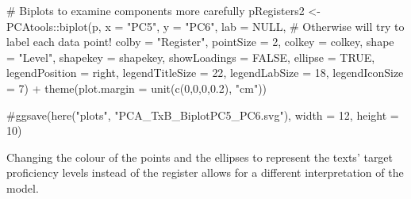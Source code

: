 \documentclass[
  letterpaper,
  DIV=11,
  numbers=noendperiod]{scrreprt}
\newenvironment{Shaded}{\begin{snugshade}}{\end{snugshade}}
\newcommand{\AttributeTok}[1]{\textcolor[rgb]{0.40,0.45,0.13}{#1}}
\newcommand{\CommentTok}[1]{\textcolor[rgb]{0.37,0.37,0.37}{#1}}
\newcommand{\ConstantTok}[1]{\textcolor[rgb]{0.56,0.35,0.01}{#1}}
\newcommand{\DecValTok}[1]{\textcolor[rgb]{0.68,0.00,0.00}{#1}}
\newcommand{\FloatTok}[1]{\textcolor[rgb]{0.68,0.00,0.00}{#1}}
\newcommand{\FunctionTok}[1]{\textcolor[rgb]{0.28,0.35,0.67}{#1}}
\newcommand{\NormalTok}[1]{\textcolor[rgb]{0.00,0.23,0.31}{#1}}
\newcommand{\OtherTok}[1]{\textcolor[rgb]{0.00,0.23,0.31}{#1}}
\newcommand{\SpecialCharTok}[1]{\textcolor[rgb]{0.37,0.37,0.37}{#1}}
\newcommand{\StringTok}[1]{\textcolor[rgb]{0.13,0.47,0.30}{#1}}
\begin{document}
\begin{Shaded}
\begin{Highlighting}[]
\CommentTok{\# Biplots to examine components more carefully}
\NormalTok{pRegisters2 }\OtherTok{\textless{}{-}}\NormalTok{ PCAtools}\SpecialCharTok{::}\FunctionTok{biplot}\NormalTok{(p,}
                 \AttributeTok{x =} \StringTok{"PC5"}\NormalTok{,}
                 \AttributeTok{y =} \StringTok{"PC6"}\NormalTok{,}
                 \AttributeTok{lab =} \ConstantTok{NULL}\NormalTok{, }\CommentTok{\# Otherwise will try to label each data point!}
                 \AttributeTok{colby =} \StringTok{"Register"}\NormalTok{,}
                 \AttributeTok{pointSize =} \DecValTok{2}\NormalTok{,}
                 \AttributeTok{colkey =}\NormalTok{ colkey,}
                 \AttributeTok{shape =} \StringTok{"Level"}\NormalTok{,}
                 \AttributeTok{shapekey =}\NormalTok{ shapekey,}
                 \AttributeTok{showLoadings =} \ConstantTok{FALSE}\NormalTok{,}
                 \AttributeTok{ellipse =} \ConstantTok{TRUE}\NormalTok{,}
                 \AttributeTok{legendPosition =} \StringTok{\textquotesingle{}right\textquotesingle{}}\NormalTok{,}
                 \AttributeTok{legendTitleSize =} \DecValTok{22}\NormalTok{,}
                 \AttributeTok{legendLabSize =} \DecValTok{18}\NormalTok{, }
                 \AttributeTok{legendIconSize =} \DecValTok{7}\NormalTok{) }\SpecialCharTok{+}
  \FunctionTok{theme}\NormalTok{(}\AttributeTok{plot.margin =} \FunctionTok{unit}\NormalTok{(}\FunctionTok{c}\NormalTok{(}\DecValTok{0}\NormalTok{,}\DecValTok{0}\NormalTok{,}\DecValTok{0}\NormalTok{,}\FloatTok{0.2}\NormalTok{), }\StringTok{"cm"}\NormalTok{))}

\CommentTok{\#ggsave(here("plots", "PCA\_TxB\_BiplotPC5\_PC6.svg"), width = 12, height = 10)}
\end{Highlighting}
\end{Shaded}

Changing the colour of the points and the ellipses to represent the
texts' target proficiency levels instead of the register allows for a
different interpretation of the model.
\end{document}
